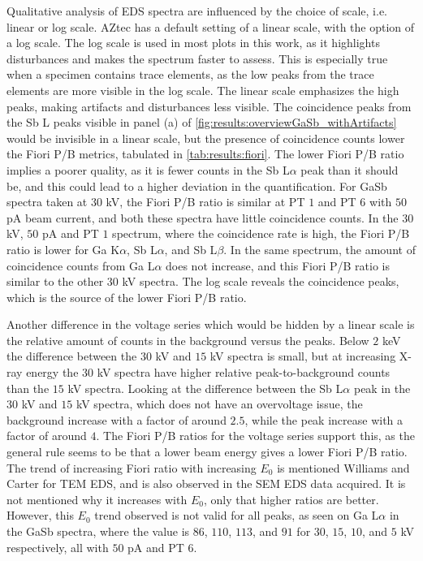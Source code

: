 Qualitative analysis of EDS spectra are influenced by the choice of scale, i.e. linear or log scale.
AZtec has a default setting of a linear scale, with the option of a log scale.
The log scale is used in most plots in this work, as it highlights disturbances and makes the spectrum faster to assess.
This is especially true when a specimen contains trace elements, as the low peaks from the trace elements are more visible in the log scale.
The linear scale emphasizes the high peaks, making artifacts and disturbances less visible.
The coincidence peaks from the Sb L peaks visible in panel (a) of \cref{fig:results:overviewGaSb_withArtifacts} would be invisible in a linear scale, but the presence of coincidence counts lower the Fiori P/B metrics, tabulated in \cref{tab:results:fiori}.
The lower Fiori P/B ratio implies a poorer quality, as it is fewer counts in the Sb L$\alpha$ peak than it should be, and this could lead to a higher deviation in the quantification.
For GaSb spectra taken at $30$ kV, the Fiori P/B ratio is similar at PT $1$ and PT $6$ with $50$ pA beam current, and both these spectra have little coincidence counts.
In the $30$ kV, $50$ pA and PT $1$ spectrum, where the coincidence rate is high, the Fiori P/B ratio is lower for Ga K$\alpha$, Sb L$\alpha$, and Sb L$\beta$.
In the same spectrum, the amount of coincidence counts from Ga L$\alpha$ does not increase, and this Fiori P/B ratio is similar to the other $30$ kV spectra.
The log scale reveals the coincidence peaks, which is the source of the lower Fiori P/B ratio.


Another difference in the voltage series which would be hidden by a linear scale is the relative amount of counts in the background versus the peaks.
Below $2$ keV the difference between the $30$ kV and $15$ kV spectra is small, but at increasing X-ray energy the $30$ kV spectra have higher relative peak-to-background counts than the $15$ kV spectra.
Looking at the difference between the Sb L$\alpha$ peak in the $30$ kV and $15$ kV spectra, which does not have an overvoltage issue, the background increase with a factor of around $2.5$, while the peak increase with a factor of around $4$.
The Fiori P/B ratios for the voltage series support this, as the general rule seems to be that a lower beam energy gives a lower Fiori P/B ratio.
The trend of increasing Fiori ratio with increasing $E_0$ is mentioned Williams and Carter \cite[p. 614]{williams_carter_tem_2009} for TEM EDS, and is also observed in the SEM EDS data acquired.
It is not mentioned why it increases with $E_0$, only that higher ratios are better.
However, this $E_0$ trend observed is not valid for all peaks, as seen on Ga L$\alpha$ in the GaSb spectra, where the value is $86$, $110$, $113$, and $91$ for $30$, $15$, $10$, and $5$ kV respectively, all with $50$ pA and PT $6$.



